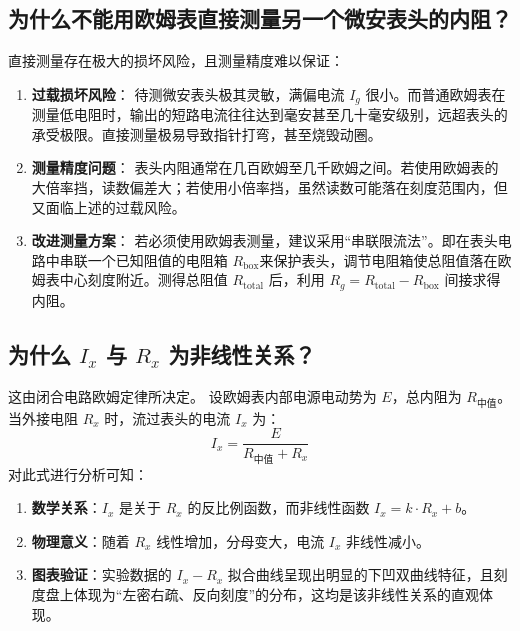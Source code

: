 \documentclass{../../templates/Report}%
\begin{document}
\begin{fullreportonly}
    \subsection{为什么不能用欧姆表直接测量另一个微安表头的内阻？}
    直接测量存在极大的损坏风险，且测量精度难以保证：
    \begin{enumerate}
        \item \textbf{过载损坏风险}：
              待测微安表头极其灵敏，满偏电流 $I_g$ 很小。而普通欧姆表在测量低电阻时，输出的短路电流往往达到毫安甚至几十毫安级别，远超表头的承受极限。直接测量极易导致指针打弯，甚至烧毁动圈。

        \item \textbf{测量精度问题}：
              表头内阻通常在几百欧姆至几千欧姆之间。若使用欧姆表的大倍率挡，读数偏差大；若使用小倍率挡，虽然读数可能落在刻度范围内，但又面临上述的过载风险。

        \item \textbf{改进测量方案}：
              若必须使用欧姆表测量，建议采用“串联限流法”。即在表头电路中串联一个已知阻值的电阻箱 $R_{\text{box}}$来保护表头，调节电阻箱使总阻值落在欧姆表中心刻度附近。测得总阻值 $R_{\text{total}}$ 后，利用 $R_g = R_{\text{total}} - R_{\text{box}}$ 间接求得内阻。
    \end{enumerate}

    \subsection{为什么 $I_x$ 与 $R_x$ 为非线性关系？}
    这由闭合电路欧姆定律所决定。
    设欧姆表内部电源电动势为 $E$，总内阻为 $R_{\text{中值}}$。当外接电阻 $R_x$ 时，流过表头的电流 $I_x$ 为：
    \begin{equation}
        I_x = \frac{E}{R_{\text{中值}} + R_x}
    \end{equation}
    对此式进行分析可知：
    \begin{enumerate}
        \item \textbf{数学关系}：$I_x$ 是关于 $R_x$ 的反比例函数，而非线性函数 $I_x = k \cdot R_x + b$。
        \item \textbf{物理意义}：随着 $R_x$ 线性增加，分母变大，电流 $I_x$ 非线性减小。
        \item \textbf{图表验证}：实验数据的 $I_x - R_x$ 拟合曲线呈现出明显的下凹双曲线特征，且刻度盘上体现为“左密右疏、反向刻度”的分布，这均是该非线性关系的直观体现。
    \end{enumerate}
\end{fullreportonly}
\insertnotes
\end{document}
